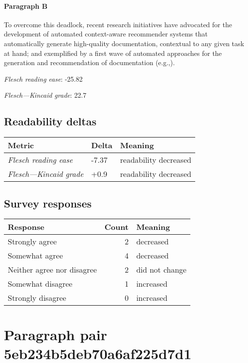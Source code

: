 \paragraph{Paragraph B}
To overcome this deadlock, recent research initiatives have advocated for the development of automated context-aware recommender systems that automatically generate high-quality documentation, contextual to any given task at hand; and exemplified by a first wave of automated approaches for the generation and recommendation of documentation (e.g.,).\par\medskip
\emph{Flesch reading ease}: -25.82\par
\emph{Flesch---Kincaid grade}: 22.7

\subsection{Readability deltas}

\begin{tabular}{lll}
\toprule
               \textbf{Metric} & \textbf{Delta} &       \textbf{Meaning} \\
\midrule
    \emph{Flesch reading ease} &          -7.37 &  readability decreased \\
 \emph{Flesch---Kincaid grade} &           +0.9 &  readability decreased \\
\bottomrule
\end{tabular}

\subsection{Survey responses}
\begin{tabular}{lrl}
\toprule
          \textbf{Response} &  \textbf{Count} & \textbf{Meaning} \\
\midrule
             Strongly agree &               2 &        decreased \\
             Somewhat agree &               4 &        decreased \\
 Neither agree nor disagree &               2 &   did not change \\
          Somewhat disagree &               1 &        increased \\
          Strongly disagree &               0 &        increased \\
\bottomrule
\end{tabular}

\section{Paragraph pair 5eb234b5deb70a6af225d7d1}
